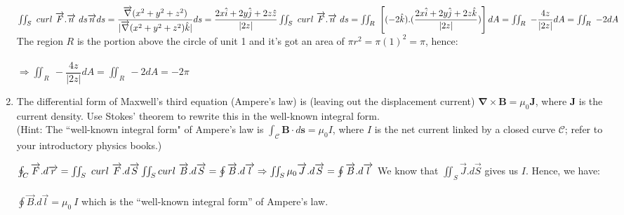 \documentclass[fleqn]{article}
\begin{document}
\begin{enumerate}
{        $
          \iint_S ~ curl ~ \overrightarrow{F}.\overrightarrow{n} ~ ds \\ \\
          \\
          \overrightarrow{n} ds=\dfrac{\overrightarrow{\nabla}(x^2+y^2+z^2)}{|\overrightarrow{\nabla}(x^2+y^2+z^2)\hat{k}|}ds=\dfrac{2x \hat{i}+2y\hat{j}+2z\hat{z}}{|2z|} \\
          \\
          \iint_S ~ curl ~ \overrightarrow{F}.\overrightarrow{n} ~ ds=\iint_R ~ \left[(-2\hat{k}).(\dfrac{2x \hat{i}+2y\hat{j}+2z\hat{k}}{|2z|})\right]dA=\iint_R ~ -\dfrac{4z}{|2z|}dA=\iint_R ~ -2dA \\ \\
        $
        The region $R$ is the portion above the circle of unit 1 and it's got an area of $\pi r^2=\pi (1)^2=\pi$, hence: \\
        \\
        $
          \Longrightarrow \iint_R ~ -\dfrac{4z}{|2z|}dA=\iint_R ~ -2dA=-2\pi
        $
      }

    \pagebreak

    \item The differential form of Maxwell's third equation (Ampere's law) is (leaving out the displacement current)
    $\mathbf{\nabla}\times \mathbf{B} = \mu_0\mathbf{J}$,
    where $\mathbf{J}$ is the current density. Use Stokes' theorem to rewrite this in the well-known integral form.\\
    (Hint: The ``well-known integral form" of Ampere's law  is  $\int_{\mathcal C} \mathbf{B}\cdot d\mathbf{s} = \mu_0 I$, where $I$ is the net current linked by a closed curve ${\mathcal C}$; refer to your introductory physics books.)

      \textcolor{hwColor}{
        $
          \oint_C \overrightarrow{F}.d\overrightarrow{r}=\iint_S ~ curl ~ \overrightarrow{F}.d\overrightarrow{S} \\ \\
          \iint_S curl ~ \overrightarrow{B}.d\overrightarrow{S}=\oint \overrightarrow{B}.d\overrightarrow{l} \\
          \\
          \\
          \Rightarrow \iint_S \mu_0 \overrightarrow{J}.d\overrightarrow{S}=\oint \overrightarrow{B}.d\overrightarrow{l} \\ \\ \\
        $
        We know that $\iint_S \overrightarrow{J}.d\overrightarrow{S}$ gives us $I$. Hence, we have: \\ \\
        $\oint \overrightarrow{B}.d\overrightarrow{l}=\mu_0 ~ I$ which is the “well-known integral form” of Ampere’s law.
      }


\end{enumerate}
\end{document}
